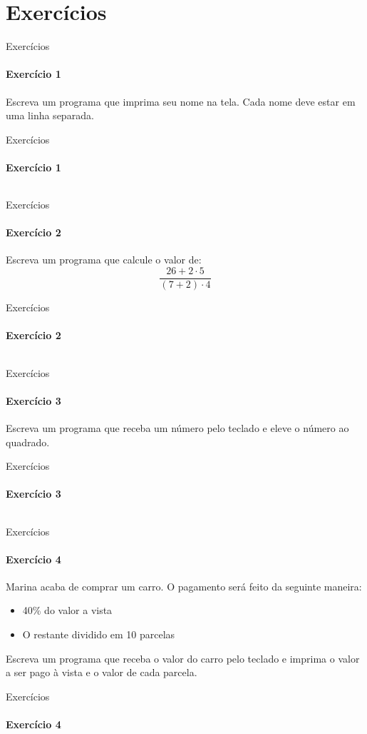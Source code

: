 \documentclass{beamer}
\begin{document}
\section{Exercícios}
\begin{frame}{Exercícios}
	\framesubtitle{Exercício 1}
	Escreva um programa que imprima seu nome na tela. Cada nome deve estar em uma linha separada.
\end{frame}
\begin{frame}{Exercícios}
	\framesubtitle{Exercício 1}
	\inputminted{c}{resources/ex1.c}
\end{frame}
\begin{frame}{Exercícios}
	\framesubtitle{Exercício 2}
	Escreva um programa que calcule o valor de:
	\begin{equation}
		\frac{26+2\cdot 5}{(7+2)\cdot 4}
	\end{equation}
\end{frame}
\begin{frame}{Exercícios}
	\framesubtitle{Exercício 2}
	\inputminted{c}{resources/ex2.c}
\end{frame}
\begin{frame}{Exercícios}
	\framesubtitle{Exercício 3}
	Escreva um programa que receba um número pelo teclado e eleve o número ao quadrado.
\end{frame}
\begin{frame}{Exercícios}
	\framesubtitle{Exercício 3}
	\inputminted{c}{resources/ex3.c}
\end{frame}
\begin{frame}{Exercícios}
	\framesubtitle{Exercício 4}
	Marina acaba de comprar um carro. O pagamento será feito da seguinte maneira:
	\begin{itemize}
		\item 40\% do valor a vista
		\item O restante dividido em 10 parcelas
	\end{itemize}
	Escreva um programa que receba o valor do carro pelo teclado e imprima o valor a ser pago à vista e o valor de cada parcela.
\end{frame}
\begin{frame}{Exercícios}
	\framesubtitle{Exercício 4}
	\inputminted[fontsize=\small]{c}{resources/ex4.c}
\end{frame}
\end{document}
